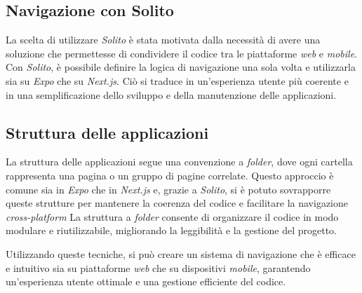 \subsection*{Navigazione con Solito}
La scelta di utilizzare \textit{Solito} è stata motivata dalla necessità di avere una soluzione che permettesse di condividere il codice tra le piattaforme \textit{web} e \textit{mobile}.
Con \textit{Solito}, è possibile definire la logica di navigazione una sola volta e utilizzarla sia su \textit{Expo} che su \textit{Next.js}. Ciò si traduce in un'esperienza utente più coerente e in una semplificazione dello sviluppo e della manutenzione delle applicazioni.

\subsection*{Struttura delle applicazioni}
La struttura delle applicazioni segue una convenzione a \textit{folder}, dove ogni cartella rappresenta una pagina o un gruppo di pagine correlate.
Questo approccio è comune sia in \textit{Expo} che in \textit{Next.js} e, grazie a \textit{Solito}, si è potuto sovrapporre queste strutture per mantenere la coerenza del codice e facilitare la navigazione \textit{cross-platform}
 La struttura a \textit{folder} consente di organizzare il codice in modo modulare e riutilizzabile, migliorando la leggibilità e la gestione del progetto.

Utilizzando queste tecniche, si può creare un sistema di navigazione che è efficace e intuitivo sia su piattaforme \textit{web} che su dispositivi \textit{mobile}, garantendo un'esperienza utente ottimale e una gestione efficiente del codice.


\newpage